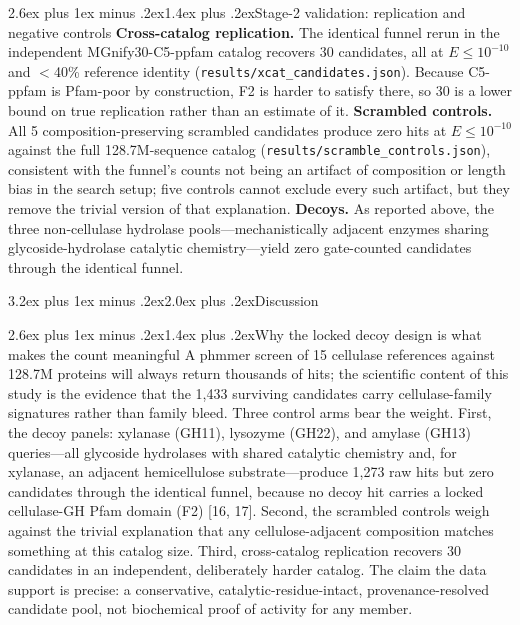 \documentclass[11pt]{article}
\makeatletter
\renewcommand{\section}{\@startsection{section}{1}{\z@}%
  {3.2ex plus 1ex minus .2ex}{2.0ex plus .2ex}{\Large\bfseries\color{navy}}}
\renewcommand{\subsection}{\@startsection{subsection}{2}{\z@}%
  {2.6ex plus 1ex minus .2ex}{1.4ex plus .2ex}{\large\bfseries\color{navy}}}
\makeatother
\begin{document}
\subsection{Stage-2 validation: replication and negative controls}
\textbf{Cross-catalog replication.} The identical funnel rerun in the independent MGnify30-C5-ppfam catalog recovers 30 candidates, all at $E \le 10^{-10}$ and $<$40\% reference identity (\texttt{results/xcat\_candidates.json}). Because C5-ppfam is Pfam-poor by construction, F2 is harder to satisfy there, so 30 is a lower bound on true replication rather than an estimate of it. \textbf{Scrambled controls.} All 5 composition-preserving scrambled candidates produce zero hits at $E \le 10^{-10}$ against the full 128.7M-sequence catalog (\texttt{results/scramble\_controls.json}), consistent with the funnel's counts not being an artifact of composition or length bias in the search setup; five controls cannot exclude every such artifact, but they remove the trivial version of that explanation. \textbf{Decoys.} As reported above, the three non-cellulase hydrolase pools---mechanistically adjacent enzymes sharing glycoside-hydrolase catalytic chemistry---yield zero gate-counted candidates through the identical funnel.

\section{Discussion}

\subsection{Why the locked decoy design is what makes the count meaningful}
A phmmer screen of 15 cellulase references against 128.7M proteins will always return thousands of hits; the scientific content of this study is the evidence that the 1,433 surviving candidates carry cellulase-family signatures rather than family bleed. Three control arms bear the weight. First, the decoy panels: xylanase (GH11), lysozyme (GH22), and amylase (GH13) queries---all glycoside hydrolases with shared catalytic chemistry and, for xylanase, an adjacent hemicellulose substrate---produce 1,273 raw hits but zero candidates through the identical funnel, because no decoy hit carries a locked cellulase-GH Pfam domain (F2) [16, 17]. Second, the scrambled controls weigh against the trivial explanation that any cellulose-adjacent composition matches something at this catalog size. Third, cross-catalog replication recovers 30 candidates in an independent, deliberately harder catalog. The claim the data support is precise: a conservative, catalytic-residue-intact, provenance-resolved candidate pool, not biochemical proof of activity for any member.
\end{document}
